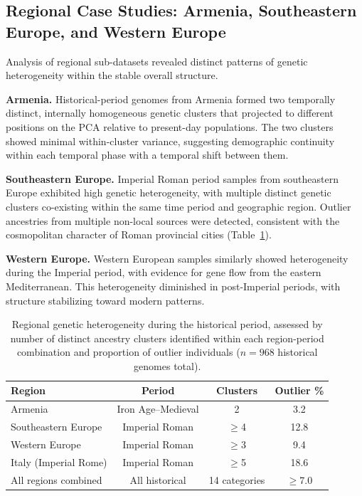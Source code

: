 \documentclass[11pt]{article}
\begin{document}
\subsection{Regional Case Studies: Armenia, Southeastern Europe, and Western Europe}

Analysis of regional sub-datasets revealed distinct patterns of genetic heterogeneity within the stable overall structure.

\textbf{Armenia.} Historical-period genomes from Armenia formed two temporally distinct, internally homogeneous genetic clusters that projected to different positions on the PCA relative to present-day populations. The two clusters showed minimal within-cluster variance, suggesting demographic continuity within each temporal phase with a temporal shift between them.

\textbf{Southeastern Europe.} Imperial Roman period samples from southeastern Europe exhibited high genetic heterogeneity, with multiple distinct genetic clusters co-existing within the same time period and geographic region. Outlier ancestries from multiple non-local sources were detected, consistent with the cosmopolitan character of Roman provincial cities (Table~\ref{tab:regional_heterogeneity}).

\textbf{Western Europe.} Western European samples similarly showed heterogeneity during the Imperial period, with evidence for gene flow from the eastern Mediterranean. This heterogeneity diminished in post-Imperial periods, with structure stabilizing toward modern patterns.

\begin{table}[H]
\centering
\caption{Regional genetic heterogeneity during the historical period, assessed by number of distinct ancestry clusters identified within each region-period combination and proportion of outlier individuals ($n = 968$ historical genomes total).}
\label{tab:regional_heterogeneity}
\begin{tabular}{lccc}
\toprule
\textbf{Region} & \textbf{Period} & \textbf{Clusters} & \textbf{Outlier \%} \\
\midrule
Armenia & Iron Age--Medieval & 2 & 3.2 \\
Southeastern Europe & Imperial Roman & $\geq$4 & 12.8 \\
Western Europe & Imperial Roman & $\geq$3 & 9.4 \\
Italy (Imperial Rome) & Imperial Roman & $\geq$5 & 18.6 \\
All regions combined & All historical & 14 categories & $\geq$7.0 \\
\bottomrule
\end{tabular}
\end{table}
\end{document}
